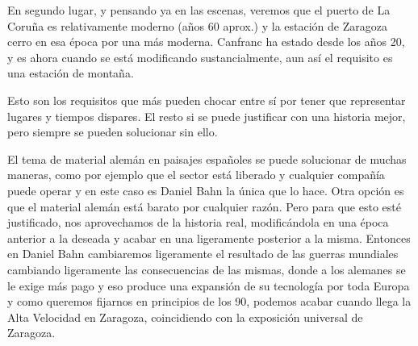 En segundo lugar, y pensando ya en las escenas, veremos que el puerto de La Coruña es
relativamente moderno (años 60 aprox.) y la estación de Zaragoza cerro en esa época por
una más moderna. Canfranc ha estado desde los años 20, y es ahora cuando se está
modificando sustancialmente, aun así el requisito es una estación de montaña. 
 
Esto son los requisitos que más pueden chocar entre sí por tener que representar lugares
y tiempos dispares. El resto si se puede justificar con una historia mejor, pero siempre
se pueden solucionar sin ello. 
 
El tema de material alemán en paisajes españoles se puede solucionar de muchas maneras,
como por ejemplo que el sector está liberado y cualquier compañía puede operar y en este
caso es Daniel Bahn la única que lo hace. Otra opción es que el material alemán está
barato por cualquier razón. Pero para que esto esté justificado, nos aprovechamos de
la historia real, modificándola en una época anterior a la deseada y acabar en una
ligeramente posterior a la misma. Entonces en Daniel Bahn cambiaremos ligeramente el
resultado de las guerras mundiales cambiando ligeramente las consecuencias de las mismas,
donde a los alemanes se le exige más pago y eso produce una expansión de su tecnología
por toda Europa y como queremos fijarnos en principios de los 90, podemos acabar cuando
llega la Alta Velocidad en Zaragoza, coincidiendo con la exposición universal de Zaragoza.